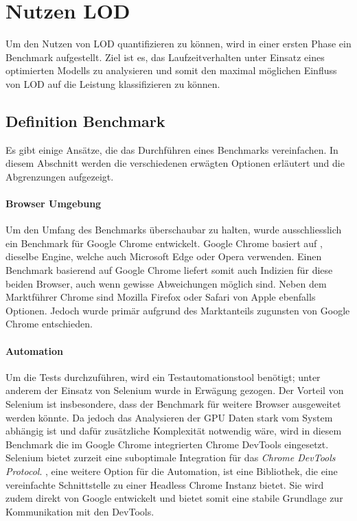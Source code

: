 \section{Nutzen LOD}
Um den Nutzen von LOD quantifizieren zu können, wird in einer ersten Phase ein Benchmark aufgestellt.
Ziel ist es, das Laufzeitverhalten unter Einsatz eines optimierten Modells zu analysieren und somit den maximal möglichen Einfluss von LOD auf die Leistung klassifizieren zu können.

\subsection{Definition Benchmark}
Es gibt einige Ansätze, die das Durchführen eines Benchmarks vereinfachen. In diesem Abschnitt werden die verschiedenen erwägten Optionen erläutert und die Abgrenzungen aufgezeigt.

\paragraph{Browser Umgebung}
Um den Umfang des Benchmarks überschaubar zu halten, wurde ausschliesslich ein Benchmark für Google Chrome entwickelt.
Google Chrome basiert auf , dieselbe Engine, welche auch Microsoft Edge oder Opera verwenden.
Einen Benchmark basierend auf Google Chrome liefert somit auch Indizien für diese beiden Browser, auch wenn gewisse Abweichungen möglich sind.
Neben dem Marktführer Chrome sind Mozilla Firefox oder Safari von Apple ebenfalls Optionen. Jedoch wurde primär aufgrund des Marktanteils zugunsten von Google Chrome entschieden.

\paragraph{Automation}
Um die Tests durchzuführen, wird ein Testautomationstool benötigt; unter anderem der Einsatz von Selenium wurde in Erwägung gezogen.
Der Vorteil von Selenium ist insbesondere, dass der Benchmark für weitere Browser ausgeweitet werden könnte.
Da jedoch das Analysieren der GPU Daten stark vom System abhängig ist und dafür zusätzliche Komplexität notwendig wäre, wird in diesem Benchmark die im Google Chrome integrierten Chrome DevTools eingesetzt.
Selenium bietet zurzeit eine suboptimale Integration für das \emph{Chrome DevTools Protocol}.
, eine weitere Option für die Automation, ist eine Bibliothek, die eine vereinfachte Schnittstelle zu einer Headless Chrome Instanz bietet.
Sie wird zudem direkt von Google entwickelt und bietet somit eine stabile Grundlage zur Kommunikation mit den DevTools.

